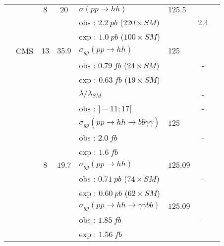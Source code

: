\begin{table}[h!]
\begin{center}
\begin{tabular}{|l|l|c|c|l|l|c|c|}
                    &            &$8$        &$20$        &$\sigma(pp\rightarrow hh)$    &$125.5$                     &    &\cite{Aad:2014yja}\\
                    &            &        &        &obs : $2.2\ pb$ ($220\times SM$)        &    &2.4    &\\
                    &            &        &        &exp : $1.0\ pb$ ($100\times SM$)        &    &    &\\
\cline{2-8}
                    &CMS            &$13$        &$35.9$        &$\sigma_{gg}(pp\rightarrow hh)$ &$125$    &    &\cite{Sirunyan:2018iwt}\\
                    &            &        &        &obs : $0.79\ fb$ ($24\times SM$)        &     &-    &\\
                    &            &        &        &exp : $0.63\ fb$ ($19\times SM$)        &     &    &\\
                    &            &        &        &$\lambda/\lambda_{SM}$                &     &-    &\\
                    &            &        &        &obs : $]-11 ; 17[$                &     &-    &\\
\cline{5-7}
                    &            &        &        &$\sigma_{gg}(pp\rightarrow hh\rightarrow b\bar{b}\gamma\gamma)$  &$125$    &    &\\
                    &            &        &        &obs : $2.0\ fb$        &     &-    &\\
                    &            &        &        &exp : $1.6\ fb$        &     &    &\\
\cline{3-8}
                    &            &$8$        &$19.7$        &$\sigma_{gg}(pp\rightarrow hh)$  &$125.09$            &    &\cite{Khachatryan:2016sey}\\
                    &            &        &        &obs : $0.71\ pb$ ($74\times SM$)    &    &-    &\\
                    &            &        &        &exp : $0.60\ pb$ ($62\times SM$)    &    &    &\\
\cline{5-7}
                    &            &        &        &$\sigma_{gg}(pp\rightarrow hh\rightarrow\gamma\gamma bb)$  &$125.09$            &    &\\
                    &            &        &        &obs : $1.85\ fb$    &    &-    &\\
                    &            &        &        &exp : $1.56\ fb$    &    &    &\\

\end{tabular}
\end{center}
\end{table}

